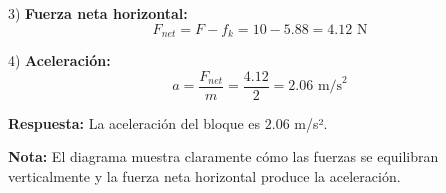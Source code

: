 \begin{ejercicio}
\begin{solucion}
3) \textbf{Fuerza neta horizontal:}
   $$F_{net} = F - f_k = 10 - 5.88 = 4.12 \text{ N}$$

4) \textbf{Aceleración:}
   $$a = \frac{F_{net}}{m} = \frac{4.12}{2} = 2.06 \text{ m/s}^2$$

\textbf{Respuesta:} La aceleración del bloque es $2.06$ m/s².

\textbf{Nota:} El diagrama muestra claramente cómo las fuerzas se equilibran verticalmente y la fuerza neta horizontal produce la aceleración.
\end{solucion}
\end{ejercicio}